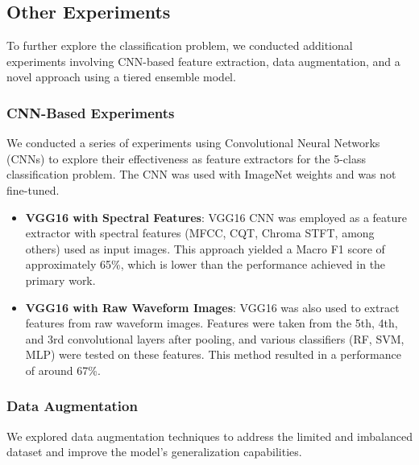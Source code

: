 \subsection{Other Experiments}
To further explore the classification problem, we conducted additional experiments 
involving CNN-based feature extraction, data augmentation, and a novel approach 
using a tiered ensemble model.

\subsubsection{CNN-Based Experiments}

We conducted a series of experiments using Convolutional Neural Networks (CNNs) to explore their 
effectiveness as feature extractors for the 5-class classification problem. The CNN was
used with ImageNet weights and was not fine-tuned.

\begin{itemize}[leftmargin=*]
    \item \textbf{VGG16 with Spectral Features}: VGG16 CNN was employed as a feature extractor with 
    spectral features (MFCC, CQT, Chroma STFT, among others) used as input images. This approach yielded 
    a Macro F1 score of approximately 65\%, which is lower than the performance achieved in the primary 
    work.
    \item \textbf{VGG16 with Raw Waveform Images}: VGG16 was also used to extract features from raw 
    waveform images. Features were taken from the 5th, 4th, and 3rd convolutional layers after pooling, 
    and various classifiers (RF, SVM, MLP) were tested on these features. This method resulted in a 
    performance of around 67\%.
\end{itemize}

\subsubsection{Data Augmentation}

We explored data augmentation techniques to address the limited and imbalanced dataset and improve
the model's generalization capabilities.

